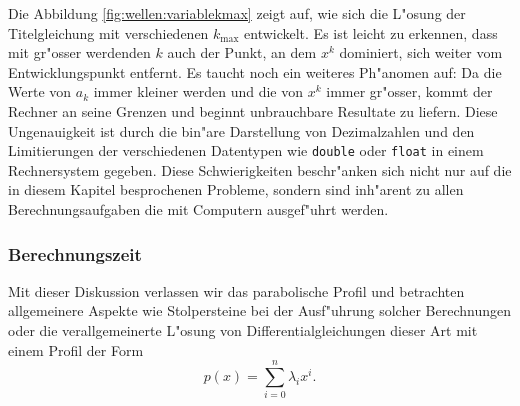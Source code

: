 Die Abbildung \ref{fig:wellen:variablekmax} zeigt auf, wie sich die L"osung 
der Titelgleichung mit verschiedenen $k_{\text{max}}$ entwickelt. Es ist leicht 
zu erkennen, dass mit gr"osser werdenden $k$ auch der Punkt, an dem $x^k$ 
dominiert, sich weiter vom Entwicklungspunkt entfernt. Es taucht noch ein 
weiteres Ph"anomen auf: Da die Werte von $a_k$ immer kleiner werden und die von 
$x^k$ immer gr"osser, kommt der Rechner an seine Grenzen und beginnt 
unbrauchbare Resultate zu liefern. Diese Ungenauigkeit ist durch die bin"are 
Darstellung von Dezimalzahlen und den Limitierungen der verschiedenen 
Datentypen wie \texttt{double} oder \texttt{float} in einem Rechnersystem 
gegeben. Diese Schwierigkeiten beschr"anken sich nicht nur auf die in diesem 
Kapitel besprochenen Probleme, sondern sind inh"arent zu allen 
Berechnungsaufgaben die mit Computern ausgef"uhrt werden.

\subsubsection{Berechnungszeit}
%





Mit dieser Diskussion verlassen wir das parabolische Profil und betrachten 
allgemeinere Aspekte wie Stolpersteine bei der Ausf"uhrung solcher Berechnungen 
oder die verallgemeinerte L"osung von Differentialgleichungen 
dieser Art mit einem Profil der Form
\begin{equation*}
p(x) = \sum_{i=0}^{n} \lambda_i x^i.
\end{equation*}
